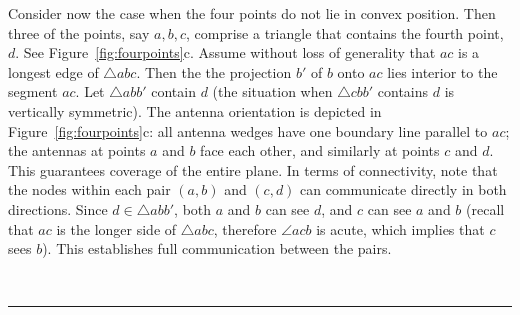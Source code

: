 \documentclass[11pt]{article}
\newcommand{\qed}{\rule{0.5em}{1.5ex}}
\newcommand{\fqed}{{\hfill~\qed}}
\newenvironment{proof}{{\noindent \bf Proof.}}
                      {{\hfill \fqed} \vspace{1em}}
\begin{document}
\begin{proof}
Consider now the case when the four points do not lie
in convex position. Then three of the points, say $a, b, c$, comprise a
triangle that contains the fourth point, $d$. See Figure~\ref{fig:fourpoints}c.
Assume without loss of generality that $ac$ is a longest edge of
$\triangle abc$. Then the the projection $b'$ of $b$ onto $ac$
lies interior to the segment $ac$. Let $\triangle abb'$ contain $d$
(the situation when $\triangle cbb'$ contains $d$ is vertically
symmetric). The antenna orientation is depicted in
Figure~\ref{fig:fourpoints}c: all antenna wedges have one boundary line
parallel to $ac$; the antennas at points $a$ and $b$ face each other,
and similarly at points $c$ and $d$. This guarantees coverage of the entire
plane. In terms of connectivity, note that the nodes within each pair
$(a, b)$ and $(c, d)$ can communicate directly in both directions.
Since $d \in \triangle abb'$, both $a$ and $b$ can see $d$, and $c$ can
see $a$ and $b$ (recall that $ac$ is the longer side of $\triangle abc$,
therefore $\angle acb$ is acute, which implies that $c$ sees $b$).
This establishes full communication between the pairs.
\end{proof}
\end{document}
